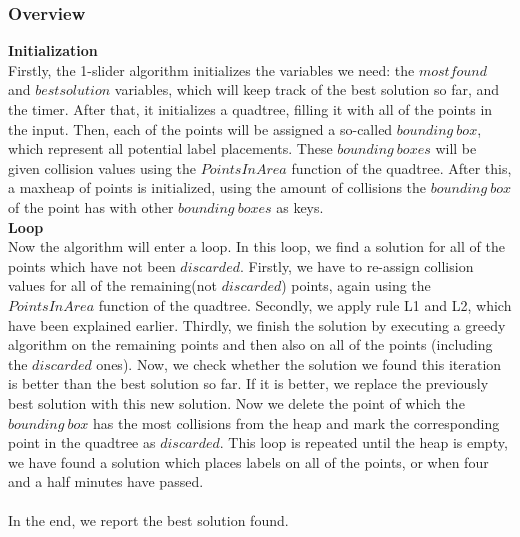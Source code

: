 \documentclass[crop=false,a4paper,oneside,11pt]{article}
\begin{document}
\subsubsection{Overview}
\textbf{Initialization}\\
Firstly, the 1-slider algorithm initializes the variables we need: the $mostfound$ and $bestsolution$ variables, which will keep track of the best solution so far, and the timer. After that, it initializes a quadtree, filling it with all of the points in the input. Then, each of the points will be assigned a so-called $bounding\ box$, which represent all potential label placements. These $bounding \ boxes$ will be given collision values using the $PointsInArea$ function of the quadtree. After this, a maxheap of points is initialized, using the amount of collisions the $bounding \ box$ of the point has with other $bounding \ boxes$ as keys. \\
\textbf{Loop} \\
Now the algorithm will enter a loop. In this loop, we find a solution for all of the points which have not been $discarded$. Firstly, we have to re-assign collision values for all of the remaining(not $discarded$) points, again using the $PointsInArea$ function of the quadtree. Secondly, we apply rule L1 and L2, which have been explained earlier. Thirdly, we finish the solution by executing a greedy algorithm on the remaining points and then also on all of the points (including the $discarded$ ones). Now, we check whether the solution we found this iteration is better than the best solution so far. If it is better, we replace the previously best solution with this new solution. Now we delete the point of which the $bounding \ box$ has the most collisions from the heap and mark the corresponding point in the quadtree as $discarded$. This loop is repeated until the heap is empty, we have found a solution which places labels on all of the points, or when four and a half minutes have passed. \\ \\ In the end, we report the best solution found. \\ 
\end{document}
